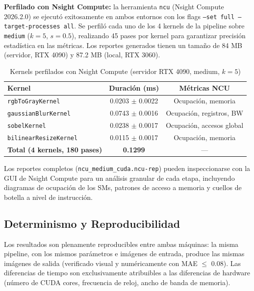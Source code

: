 \documentclass[12pt,a4paper]{article}
\begin{document}
\textbf{Perfilado con Nsight Compute:} la herramienta \texttt{ncu} (Nsight Compute 2026.2.0) se ejecut\'o exitosamente en ambos entornos con los flags \texttt{--set full --target-processes all}. Se perfil\'o cada uno de los 4 kernels de la pipeline sobre \texttt{medium} ($k=5$, $s=0.5$), realizando 45 pases por kernel para garantizar precisi\'on estad\'istica en las m\'etricas. Los reportes generados tienen un tama\~no de 84 MB (servidor, RTX 4090) y 87.2 MB (local, RTX 3060).

\begin{table}[H]
\centering
\caption{Kernels perfilados con Nsight Compute (servidor RTX 4090, medium, $k=5$)}
\label{tab:ncu}
\small
\begin{tabular}{lcc}
\toprule
\textbf{Kernel} & \textbf{Duraci\'on (ms)} & \textbf{M\'etricas NCU} \\
\midrule
\texttt{rgbToGrayKernel}       & 0.0203 $\pm$ 0.0022 & Ocupaci\'on, memoria \\
\texttt{gaussianBlurKernel}    & 0.0743 $\pm$ 0.0016 & Ocupaci\'on, registros, BW \\
\texttt{sobelKernel}           & 0.0238 $\pm$ 0.0017 & Ocupaci\'on, accesos global \\
\texttt{bilinearResizeKernel}  & 0.0115 $\pm$ 0.0017 & Ocupaci\'on, memoria \\
\midrule
\textbf{Total (4 kernels, 180 pases)} & \textbf{0.1299} & --- \\
\bottomrule
\end{tabular}
\end{table}

Los reportes completos (\texttt{ncu\_medium\_cuda.ncu-rep}) pueden inspeccionarse con la GUI de Nsight Compute para un an\'alisis granular de cada etapa, incluyendo diagramas de ocupaci\'on de los SMs, patrones de acceso a memoria y cuellos de botella a nivel de instrucci\'on.

\subsection{Determinismo y Reproducibilidad}

Los resultados son plenamente reproducibles entre ambas m\'aquinas: la misma pipeline, con los mismos par\'ametros e im\'agenes de entrada, produce las mismas im\'agenes de salida (verificado visual y num\'ericamente con MAE $\leq$ 0.08). Las diferencias de tiempo son exclusivamente atribuibles a las diferencias de hardware (n\'umero de CUDA cores, frecuencia de reloj, ancho de banda de memoria).
\end{document}
